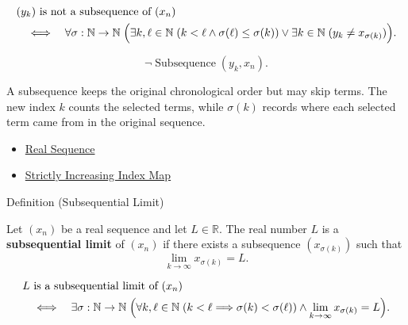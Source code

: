 \begin{remark*}
\[
\begin{aligned}
&(y_k)\text{ is not a subsequence of }(x_n)\\
&\quad\Longleftrightarrow\quad
\forall \sigma:\mathbb{N}\to\mathbb{N}\;
\Bigl(
  \exists k,\ell\in\mathbb{N}\;(k<\ell\land \sigma(\ell)\le\sigma(k))
  \lor
  \exists k\in\mathbb{N}\;(y_k\neq x_{\sigma(k)})
\Bigr).
\end{aligned}
\]
\end{remark*}

\begin{remark*}
\[
\neg\operatorname{Subsequence}(y_k,x_n).
\]
\end{remark*}

\begin{remark*}[Interpretation]
A subsequence keeps the original chronological order but may skip terms. The
new index $k$ counts the selected terms, while $\sigma(k)$ records where each
selected term came from in the original sequence.
\end{remark*}

\begin{dependencies}
\begin{itemize}
  \item \hyperref[def:real-sequence]{Real Sequence}
  \item \hyperref[def:strictly-increasing-index-map]{Strictly Increasing Index Map}
\end{itemize}
\end{dependencies}


\begin{definitionbox}{Definition (Subsequential Limit)}
\begin{definition}
\label{def:subsequential-limit}
Let $(x_n)$ be a real sequence and let $L\in\mathbb{R}$. The real number
$L$ is a \textbf{subsequential limit} of $(x_n)$ if there exists a
subsequence $(x_{\sigma(k)})$ such that
\[
  \lim_{k\to\infty} x_{\sigma(k)}=L.
\]
\end{definition}
\end{definitionbox}

\begin{remark*}
\[
\begin{aligned}
&L\text{ is a subsequential limit of }(x_n)\\
&\quad\Longleftrightarrow\quad
\exists \sigma:\mathbb{N}\to\mathbb{N}\;
\Bigl(
  \forall k,\ell\in\mathbb{N}\;(k<\ell\Longrightarrow \sigma(k)<\sigma(\ell))
  \land
  \lim_{k\to\infty}x_{\sigma(k)}=L
\Bigr).
\end{aligned}
\]
\end{remark*}

